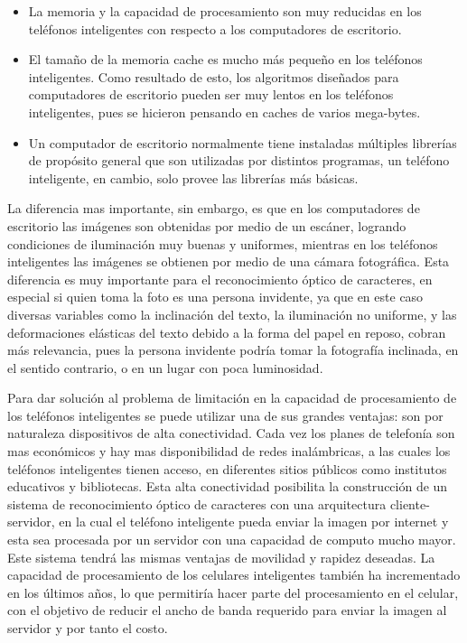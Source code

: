 \documentclass[a4paper, 12pt, oneside]{article}
\begin{document}
	\begin{itemize}
	
	\item La memoria y la capacidad de procesamiento son muy reducidas en los teléfonos inteligentes con respecto a los computadores de escritorio.

	\item El tamaño de la memoria cache es mucho más pequeño en los teléfonos inteligentes. Como resultado de esto, los algoritmos diseñados para computadores de escritorio pueden ser muy lentos en los teléfonos inteligentes, pues se hicieron pensando en caches de varios mega-bytes.

	\item Un computador de escritorio normalmente tiene instaladas múltiples librerías de propósito general que son utilizadas por distintos programas, un teléfono inteligente, en cambio, solo provee las librerías más básicas.

	\end{itemize}

	La diferencia mas importante, sin embargo, es que en los computadores de escritorio las imágenes son obtenidas por medio de un escáner, logrando condiciones de iluminación muy buenas y uniformes, mientras en los teléfonos inteligentes las imágenes se obtienen por medio de una cámara fotográfica. Esta diferencia es muy importante para el reconocimiento óptico de caracteres, en especial si quien toma la foto es una persona invidente, ya que en este caso diversas variables como la inclinación del texto, la iluminación no uniforme, y las deformaciones elásticas del texto debido a la forma del papel en reposo, cobran más relevancia, pues la persona invidente podría tomar la fotografía inclinada, en el sentido contrario, o en un lugar con poca luminosidad.

	Para dar solución al problema de limitación en la capacidad de procesamiento de los teléfonos inteligentes se puede utilizar una de sus grandes ventajas: son por naturaleza dispositivos de alta conectividad. Cada vez los planes de telefonía son mas económicos y hay mas disponibilidad de redes inalámbricas, a las cuales los teléfonos inteligentes tienen acceso, en diferentes sitios públicos como institutos educativos y bibliotecas. Esta alta conectividad posibilita la construcción de un sistema de reconocimiento óptico de caracteres con una arquitectura cliente-servidor, en la cual el teléfono inteligente pueda enviar la imagen por internet y esta sea procesada por un servidor con una capacidad de computo mucho mayor. Este sistema tendrá las mismas ventajas de movilidad y rapidez deseadas. La capacidad de procesamiento de los celulares inteligentes también ha incrementado en los últimos años, lo que permitiría hacer parte del procesamiento en el celular, con el objetivo de reducir el ancho de banda requerido para enviar la imagen al servidor y por tanto el costo.
\end{document}
